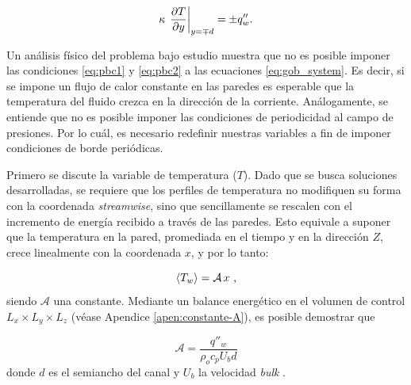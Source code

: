 \begin{equation}
\kappa \hspace{0.5mm} \left. \frac{\partial T}{\partial y} \right\vert_{y=\mp d} = \pm q''_w \text{.}
\label{eq:neumann}
\end{equation}

%
%

Un análisis físico del problema bajo estudio muestra que no es posible imponer las condiciones \ref{eq:pbc1} y \ref{eq:pbc2} a las ecuaciones \ref{eq:gob_system}. Es decir, si se impone un flujo de calor constante en las paredes es esperable que la temperatura del fluido crezca en la dirección de la corriente. Análogamente, se entiende que no es posible imponer las condiciones de periodicidad al campo de presiones. Por lo cuál, es necesario redefinir nuestras variables a fin de imponer condiciones de borde periódicas.

Primero se discute la variable de temperatura ($T$). Dado que se busca soluciones desarrolladas, se requiere que  los perfiles de temperatura no modifiquen su forma con la coordenada \textit{streamwise}, sino que sencillamente se rescalen con el incremento de energía recibido a través de las paredes. Esto equivale a suponer que la temperatura en la pared, promediada en el tiempo y en la dirección $Z$, crece linealmente con la coordenada $x$, y por lo tanto: 

$$
\langle T_w \rangle = \mathcal{A} \hspace{0.5mm} x \text{ ,}
$$
siendo $\mathcal{A}$ una constante. Mediante un balance energético en el volumen de control $L_x \times L_y \times L_z$ (véase Apendice \ref{apen:constante-A}), es posible demostrar que

$$\mathcal{A} = \frac{q''_w}{\rho_o  c_p U_b d} $$ 
donde $d$ es el semiancho del canal y $U_b$ la velocidad \textit{bulk} \cite{pope2001turbulent}.

